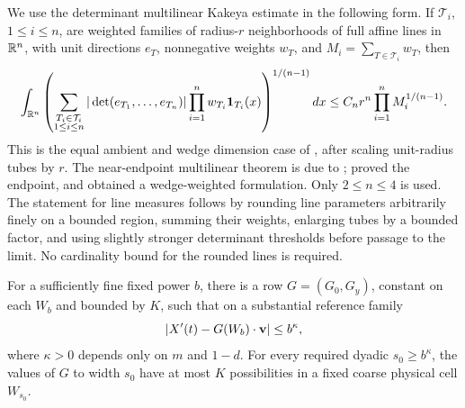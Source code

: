 We use the determinant multilinear Kakeya estimate in the following
form. If \(\mathcal T_i\), \(1\leq i\leq n\), are weighted families of
radius-\(r\) neighborhoods of full affine lines in \(\mathbb R^n\), with
unit directions \(e_T\), nonnegative weights \(w_T\), and
\(M_i=\sum_{T\in\mathcal T_i}w_T\), then
\begin{equation}\label{a05:determinant-kakeya}
 \int_{\mathbb R^n}
 \left(
 \sum_{\substack{T_i\in\mathcal T_i\\1\leq i\leq n}}
 |\det(e_{T_1},\ldots,e_{T_n})|
 \prod_{i=1}^n w_{T_i}\mathbf 1_{T_i}(x)
 \right)^{1/(n-1)}dx
 \leq C_n r^n\prod_{i=1}^n M_i^{1/(n-1)}.
\end{equation}
This is the equal ambient and wedge dimension case of
\citet[Theorem~1]{CarberyValdimarsson}, after scaling unit-radius
tubes by \(r\).
The near-endpoint multilinear theorem is due to
\citet{BennettCarberyTao2006}; \citet{Guth2010} proved the endpoint,
and \citet[Section~7]{BourgainGuth2011} obtained a wedge-weighted
formulation.
Only \(2\leq n\leq4\) is used. The statement for line measures follows
by rounding line parameters arbitrarily finely on a bounded region,
summing their weights, enlarging tubes by a bounded factor, and using
slightly stronger determinant thresholds before passage to the limit.
No cardinality bound for the rounded lines is required.

\begin{proposition}\label{a05:velocity-graph}
For a sufficiently fine fixed power \(b\), there is a row
\(G=(G_0,G_y)\), constant on each \(W_b\) and bounded by \(K\), such
that on a substantial reference family
\begin{equation}\label{a05:velocity-graph-estimate}
 |X'(t)-G(W_b)\cdot{\bf v}|\leq b^\kappa,
\end{equation}
where \(\kappa>0\) depends only on \(m\) and \(1-d\).
For every required dyadic \(s_0\geq b^\kappa\), the values of \(G\)
to width \(s_0\) have at most \(K\) possibilities in a fixed
coarse physical cell \(W_{s_0}\).
\end{proposition}

